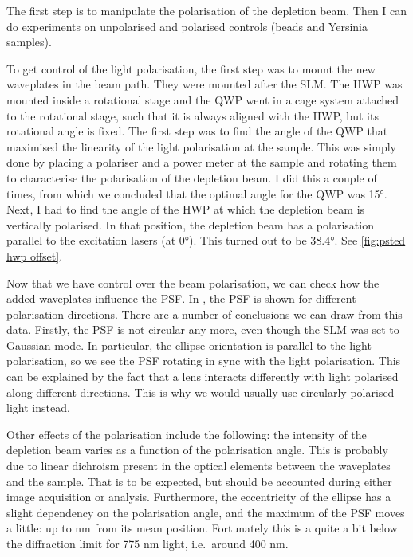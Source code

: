  The first step is to manipulate the polarisation of the depletion beam. Then I can do experiments on unpolarised and polarised controls (beads and Yersinia samples).

To get control of the light polarisation, the first step was to mount the new waveplates in the beam path. They were mounted after the SLM. The HWP was mounted inside a rotational stage and the QWP went in a cage system attached to the rotational stage, such that it is always aligned with the HWP, but its rotational angle is fixed. The first step was to find the angle of the QWP that maximised the linearity of the light polarisation at the sample. This was simply done by placing a polariser and a power meter at the sample and rotating them to characterise the polarisation of the depletion beam. I did this a couple of times, from which we concluded that the optimal angle for the QWP was 15°.  Next, I had to find the angle of the HWP at which the depletion beam is vertically polarised. In that position, the depletion beam has a polarisation parallel to the excitation lasers (at 0°). This turned out to be 38.4°. See \autoref{fig:psted hwp offset}.

Now that we have control over the beam polarisation, we can check how the added waveplates influence the PSF. In , the PSF is shown for different polarisation directions. There are a number of conclusions we can draw from this data.  Firstly, the PSF is not circular any more, even though the SLM was set to Gaussian mode. In particular, the ellipse orientation is parallel to the light polarisation, so we see the PSF rotating in sync with the light polarisation. This can be explained by the fact that a lens interacts differently with light polarised along different directions. This is why we would usually use circularly polarised light instead.

Other effects of the polarisation include the following: the intensity of the depletion beam varies as a function of the polarisation angle. This is probably due to linear dichroism present in the optical elements between the waveplates and the sample. That is to be expected, but should be accounted during either image acquisition or analysis. Furthermore, the eccentricity of the ellipse has a slight dependency on the polarisation angle, and the maximum of the PSF moves a little: up to  nm from its mean position. Fortunately this is a quite a bit below the diffraction limit for 775 nm light, i.e.~around 400 nm.

